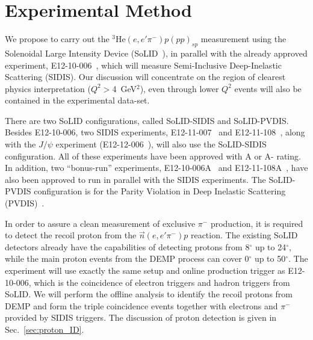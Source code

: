 \section{Experimental Method}

We propose to carry out the $^3$He$(e,e'\pi^-)p(pp)_{sp}$ measurement using the
Solenoidal Large Intensity Device (SoLID~\cite{solid_pcdr}), in parallel with
the already approved experiment, E12-10-006~\cite{solid:e12-10-006}, which will
measure Semi-Inclusive Deep-Inelastic Scattering (SIDIS). 
Our discussion will concentrate on the region of clearest physics
interpretation ($Q^2>$4~GeV$^2$), even through lower $Q^2$ events will also be
contained in the experimental data-set.

There are two SoLID
configurations, called SoLID-SIDIS and SoLID-PVDIS. Besides E12-10-006, two
SIDIS experiments, E12-11-007~\cite{solid:e12-11-007} and
E12-11-108~\cite{solid:e12-11-108}, along with the $J/\psi$ experiment
(E12-12-006~\cite{solid:e12-12-006}), will also use the SoLID-SIDIS
configuration. All of these experiments have been approved with A or A-
rating.  In addition, two ``bonus-run'' experiments,
E12-10-006A~\cite{solid:e12-10-006A} and E12-11-108A~\cite{solid:e12-11-008A},
have also been approved to run in parallel with the SIDIS experiments. The
SoLID-PVDIS configuration is for the Parity Violation in Deep Inelastic
Scattering (PVDIS)~\cite{solid:e12-10-007}.

In order to assure a clean measurement of exclusive $\pi^-$ production, it is
required to detect the recoil proton from the $\vec{n}(e,e'\pi^-)p$ reaction.
The existing SoLID detectors already have the capabilities of detecting protons
from 8$^{\circ}$ up to 24$^{\circ}$, while the main proton events from the DEMP
process can cover 0$^{\circ}$ up to 50$^{\circ}$.  The experiment will use
exactly the same setup and online production trigger as E12-10-006, which is
the coincidence of electron triggers and hadron triggers from SoLID. We will
perform the offline analysis to identify the recoil protons from DEMP and form
the triple coincidence events together with electrons and $\pi^{-}$ provided by
SIDIS triggers. The discussion of proton detection is given in
Sec.~\ref{sec:proton_ID}.


